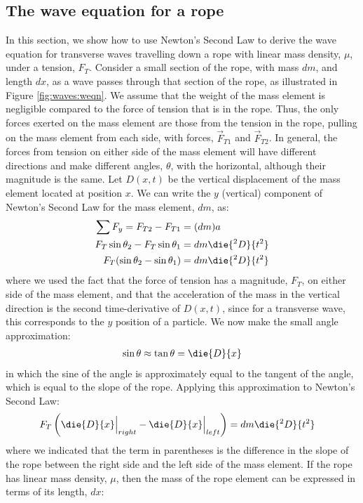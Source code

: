 \subsection{The wave equation for a rope}
In this section, we show how to use Newton's Second Law to derive the wave equation for transverse waves travelling down a rope with linear mass density, $\mu$, under a tension, $F_T$. Consider a small section of the rope, with mass $dm$, and length $dx$, as a wave passes through that section of the rope, as illustrated in Figure \ref{fig:waves:weqn}.
We assume that the weight of the mass element is negligible compared to the force of tension that is in the rope. Thus, the only forces exerted on the mass element are those from the tension in the rope, pulling on the mass element from each side, with forces, $\vec F_{T1}$ and $\vec F_{T2}$. In general, the forces from tension on either side of the mass element will have different directions and make different angles, $\theta$, with the horizontal, although their magnitude is the same. Let $D(x,t)$ be the vertical displacement of the mass element located at position $x$. We can write the $y$ (vertical) component of Newton's Second Law for the mass element, $dm$, as:
\begin{align*}
\sum F_y = F_{T2} - F_{T1} &= (dm)a\\
F_T\sin\theta_2 - F_T\sin\theta_1 &= dm \die{^2D}{t^2}\\
F_T(\sin\theta_2 - \sin\theta_1) &= dm \die{^2D}{t^2}
\end{align*}
where we used the fact that the force of tension has a magnitude, $F_T$, on either side of the mass element, and that the acceleration of the mass in the vertical direction is the second time-derivative of $D(x,t)$, since for a transverse wave, this corresponds to the $y$ position of a particle. We now make the small angle approximation:
\begin{align*}
\sin\theta\approx \tan\theta = \die{D}{x}
\end{align*}
in which the sine of the angle is approximately equal to the tangent of the angle, which is equal to the slope of the rope. Applying this approximation to Newton's Second Law:
\begin{align*}
F_T\left(\die{D}{x}\Bigr|_{right} - \die{D}{x}\Bigr|_{left}\right) &= dm \die{^2D}{t^2}
\end{align*}
where we indicated that the term in parentheses is the difference in the slope of the rope between the right side and the left side of the mass element. If the rope has linear mass density, $\mu$, then the mass of the rope element can be expressed in terms of its length, $dx$:
